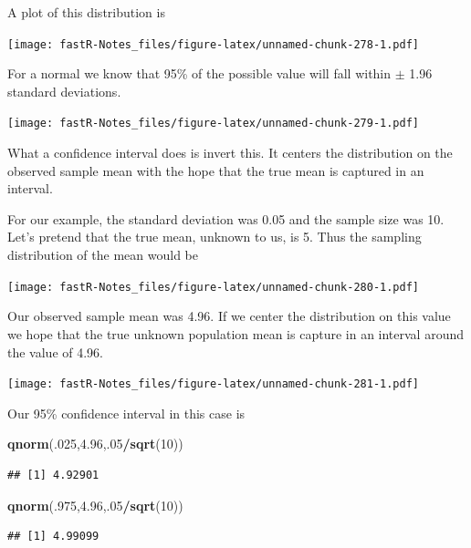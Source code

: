 \documentclass[]{book}
\newenvironment{Shaded}{\begin{snugshade}}{\end{snugshade}}
\newcommand{\KeywordTok}[1]{\textcolor[rgb]{0.13,0.29,0.53}{\textbf{#1}}}
\newcommand{\DecValTok}[1]{\textcolor[rgb]{0.00,0.00,0.81}{#1}}
\newcommand{\FloatTok}[1]{\textcolor[rgb]{0.00,0.00,0.81}{#1}}
\newcommand{\OperatorTok}[1]{\textcolor[rgb]{0.81,0.36,0.00}{\textbf{#1}}}
\newcommand{\NormalTok}[1]{#1}
\theoremstyle{definition}
\theoremstyle{definition}
\theoremstyle{definition}
\theoremstyle{remark}
\begin{document}
A plot of this distribution is

\texttt{[image: fastR-Notes\_files/figure-latex/unnamed-chunk-278-1.pdf]}

For a normal we know that 95\% of the possible value will fall within
\(\pm\) 1.96 standard deviations.

\texttt{[image: fastR-Notes\_files/figure-latex/unnamed-chunk-279-1.pdf]}

What a confidence interval does is invert this. It centers the
distribution on the observed sample mean with the hope that the true
mean is captured in an interval.

For our example, the standard deviation was 0.05 and the sample size was
10. Let's pretend that the true mean, unknown to us, is 5. Thus the
sampling distribution of the mean would be

\texttt{[image: fastR-Notes\_files/figure-latex/unnamed-chunk-280-1.pdf]}

Our observed sample mean was 4.96. If we center the distribution on this
value we hope that the true unknown population mean is capture in an
interval around the value of 4.96.

\texttt{[image: fastR-Notes\_files/figure-latex/unnamed-chunk-281-1.pdf]}

Our 95\% confidence interval in this case is

\begin{Shaded}
\begin{Highlighting}[]
\KeywordTok{qnorm}\NormalTok{(.}\DecValTok{025}\NormalTok{,}\FloatTok{4.96}\NormalTok{,.}\DecValTok{05}\OperatorTok{/}\KeywordTok{sqrt}\NormalTok{(}\DecValTok{10}\NormalTok{))}
\end{Highlighting}
\end{Shaded}

\begin{verbatim}
## [1] 4.92901
\end{verbatim}

\begin{Shaded}
\begin{Highlighting}[]
\KeywordTok{qnorm}\NormalTok{(.}\DecValTok{975}\NormalTok{,}\FloatTok{4.96}\NormalTok{,.}\DecValTok{05}\OperatorTok{/}\KeywordTok{sqrt}\NormalTok{(}\DecValTok{10}\NormalTok{))}
\end{Highlighting}
\end{Shaded}

\begin{verbatim}
## [1] 4.99099
\end{verbatim}
\end{document}
